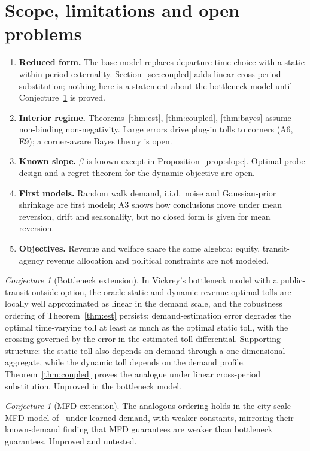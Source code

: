 \documentclass[11pt]{article}
\theoremstyle{definition}
\theoremstyle{remark}
\newtheorem{conjecture}[theorem]{Conjecture}
\begin{document}
\section{Scope, limitations and open problems}\label{sec:open}
\begin{enumerate}[label=\textbf{L\arabic*.}]
\item \textbf{Reduced form.} The base model replaces departure-time choice with a static within-period externality. Section~\ref{sec:coupled} adds linear cross-period substitution; nothing here is a statement about the bottleneck model until Conjecture~\ref{conj:bottle} is proved.
\item \textbf{Interior regime.} Theorems~\ref{thm:est}, \ref{thm:coupled}, \ref{thm:bayes} assume non-binding non-negativity. Large errors drive plug-in tolls to corners (A6, E9); a corner-aware Bayes theory is open.
\item \textbf{Known slope.} $\beta$ is known except in Proposition~\ref{prop:slope}. Optimal probe design and a regret theorem for the dynamic objective are open.
\item \textbf{First models.} Random walk demand, i.i.d.\ noise and Gaussian-prior shrinkage are first models; A3 shows how conclusions move under mean reversion, drift and seasonality, but no closed form is given for mean reversion.
\item \textbf{Objectives.} Revenue and welfare share the same algebra; equity, transit-agency revenue allocation and political constraints are not modeled.
\end{enumerate}
\begin{conjecture}[Bottleneck extension]\label{conj:bottle}
In Vickrey's bottleneck model with a public-transit outside option, the oracle static and dynamic revenue-optimal tolls are locally well approximated as linear in the demand scale, and the robustness ordering of Theorem~\ref{thm:est} persists: demand-estimation error degrades the optimal time-varying toll at least as much as the optimal static toll, with the crossing governed by the error in the estimated toll differential. Supporting structure: the static toll also depends on demand through a one-dimensional aggregate, while the dynamic toll depends on the demand profile. Theorem~\ref{thm:coupled} proves the analogue under linear cross-period substitution. Unproved in the bottleneck model.
\end{conjecture}
\begin{conjecture}[MFD extension]\label{conj:mfd}
The analogous ordering holds in the city-scale MFD model of~\cite{jde2026} under learned demand, with weaker constants, mirroring their known-demand finding that MFD guarantees are weaker than bottleneck guarantees. Unproved and untested.
\end{conjecture}
\end{document}
